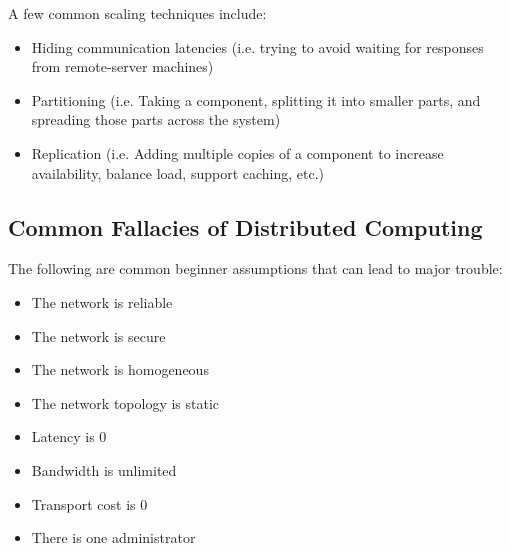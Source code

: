 \documentclass[12pt,titlepage]{article}
\begin{document}
        A few common scaling techniques include:
        \begin{itemize}
          \item Hiding communication latencies (i.e. trying to avoid waiting for responses from remote-server machines)
          \item Partitioning (i.e. Taking a component, splitting it into smaller parts, and spreading those parts across the system)
          \item Replication (i.e. Adding multiple copies of a component to increase availability, balance load, support caching, etc.)
        \end{itemize}

      \subsection{Common Fallacies of Distributed Computing}
        The following are common beginner assumptions that can lead to major trouble:
        \begin{itemize}
          \item The network is reliable
          \item The network is secure
          \item The network is homogeneous
          \item The network topology is static
          \item Latency is 0
          \item Bandwidth is unlimited
          \item Transport cost is 0
          \item There is one administrator
        \end{itemize}
\end{document}
